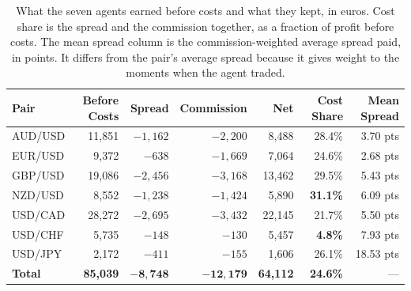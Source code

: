\begin{table}[htb!]
\centering
\footnotesize
\caption{What the seven agents earned before costs and what they kept, in euros. Cost share is the spread and the commission together, as a fraction of profit before costs. The mean spread column is the commission-weighted average spread paid, in points. It differs from the pair's average spread because it gives weight to the moments when the agent traded.}
\label{Tables:Costs}
\begin{tabular}{@{}lrrrrrr@{}}
\toprule
\textbf{Pair} & \textbf{Before Costs} & \textbf{Spread} & \textbf{Commission} & \textbf{Net} & \textbf{Cost Share} & \textbf{Mean Spread} \\
\midrule
AUD/USD & 11,851 & $-1,162$ & $-2,200$ & 8,488 & 28.4\% & 3.70 pts \\
EUR/USD & 9,372 & $-638$ & $-1,669$ & 7,064 & 24.6\% & 2.68 pts \\
GBP/USD & 19,086 & $-2,456$ & $-3,168$ & 13,462 & 29.5\% & 5.43 pts \\
NZD/USD & 8,552 & $-1,238$ & $-1,424$ & 5,890 & \textbf{31.1\%} & 6.09 pts \\
USD/CAD & 28,272 & $-2,695$ & $-3,432$ & 22,145 & 21.7\% & 5.50 pts \\
USD/CHF & 5,735 & $-148$ & $-130$ & 5,457 & \textbf{4.8\%} & 7.93 pts \\
USD/JPY & 2,172 & $-411$ & $-155$ & 1,606 & 26.1\% & 18.53 pts \\
\midrule
\textbf{Total} & \textbf{85,039} & $\mathbf{-8,748}$ & $\mathbf{-12,179}$ & \textbf{64,112} & \textbf{24.6\%} & --- \\
\bottomrule
\end{tabular}
\end{table}